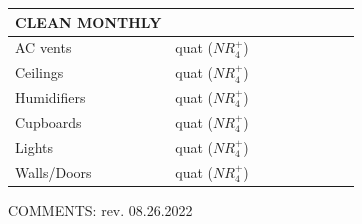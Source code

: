 \documentclass{sop_class}[overrideChapters] %
\begin{document}
{\begin{table}[!htbp]
\begin{threeparttable}
\begin{tabular}{|l|l|c|c|c|c|c|c|c|}
        \hline
        {\textbf{CLEAN MONTHLY}} & {} & {} & {} & {} & {} & {} & {} & {} \\
            \hline
            {AC vents} & {quat ($NR_{4}^{+}$)} & {} & {} & {} & {} & {} & {} & {} \\
        \hline
        {Ceilings} & {quat ($NR_{4}^{+}$)} & {} & {} & {} & {} & {} & {} & {} \\
        \hline
        {Humidifiers} & {quat ($NR_{4}^{+}$)} & {} & {} & {} & {} & {} & {} & {} \\
        \hline
        {Cupboards} & {quat ($NR_{4}^{+}$)} & {} & {} & {} & {} & {} & {} & {} \\
        \hline
        {Lights} & {quat ($NR_{4}^{+}$)} & {} & {} & {} & {} & {} & {} & {} \\
        \hline
        {Walls/Doors} & {quat ($NR_{4}^{+}$)} & {} & {} & {} & {} & {} & {} & {} \\
        \hline
            \end{tabular}
        \begin{tablenotes}
            \small
            \item COMMENTS: \hfill{} rev. 08.26.2022 \\
            \\
            \\
            \\
        \end{tablenotes}
    \end{threeparttable}
\end{table}
\clearpage
\newpage

}
\end{document}
